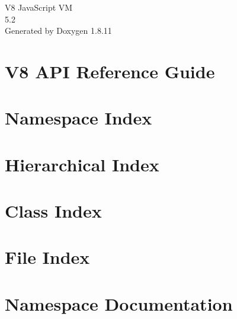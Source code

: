 \documentclass[twoside]{book}
\newcommand{\+}{\discretionary{\mbox{\scriptsize$\hookleftarrow$}}{}{}}
\newcommand{\clearemptydoublepage}{%
  \newpage{\pagestyle{empty}\cleardoublepage}%
}
\begin{document}
\hypersetup{pageanchor=false,
             bookmarksnumbered=true,
             pdfencoding=unicode
            }
\begin{titlepage}
\vspace*{7cm}
\begin{center}%
{\Large V8 Java\+Script VM \\[1ex]\large 5.\+2 }\\
\vspace*{1cm}
{\large Generated by Doxygen 1.8.11}\\
\end{center}
\end{titlepage}
\clearemptydoublepage
\tableofcontents
\clearemptydoublepage
{}
\hypersetup{pageanchor=true}

\chapter{V8 A\+PI Reference Guide}
\label{index}\hypertarget{index}{}
\chapter{Namespace Index}

\chapter{Hierarchical Index}

\chapter{Class Index}

\chapter{File Index}

\chapter{Namespace Documentation}

\end{document}

